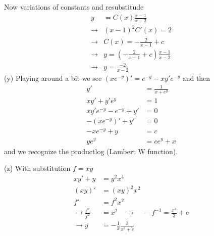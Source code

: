 \documentclass[10pt,a4paper]{book}
\theoremstyle{definition}
\begin{document}
Now variations of constants and resubstitude
\begin{align}
y&=C(x)\frac{x-1}{x-2}\\
\rightarrow&(x-1)^2C'(x)=2\\
\rightarrow&C(x)=-\frac{2}{x-1}+c\\
\rightarrow&y=\left(-\frac{2}{x-1}+c\right)\frac{x-1}{x-2}\\
\rightarrow&y=\frac{-2}{x-2}
\end{align}
(y) Playing around a bit we see $(xe^{-y})'=e^{-y}-xy'e^{-y}$ and then
\begin{align}
y'&=\frac{1}{x+e^y}\\
xy'+y'e^y&=1\\
xy'e^{-y}-e^{-y}+y'&=0\\
-(xe^{-y})'+y'&=0\\
-xe^{-y}+y&=c\\
ye^y&=ce^y+x
\end{align}
and we recognize the productlog (Lambert W function).

(z) With substitution $f=xy$
\begin{align}
xy'+y&=y^2x^4\\
(xy)'&=(xy)^2x^2\\
f'&=f^2x^2\\
\rightarrow\frac{f'}{f^2}&=x^2\quad\rightarrow\quad-f^{-1}=\frac{x^3}{3}+c\\
\rightarrow y&=-\frac{1}{x}\frac{3}{x^3+\tilde{c}}
\end{align}
\end{document}
